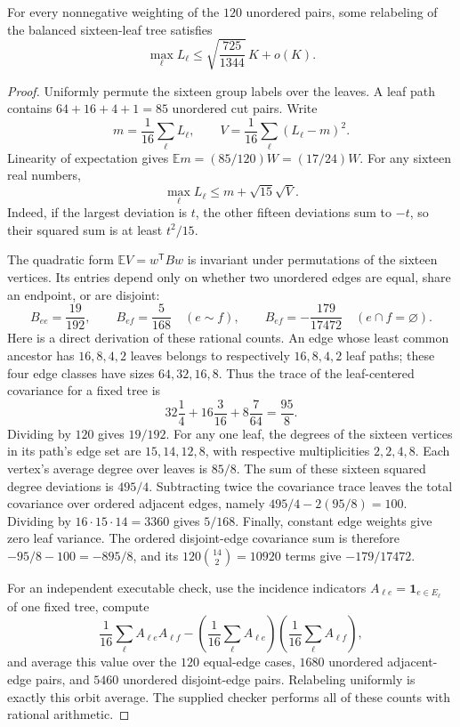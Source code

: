 \begin{lemma}
\label{lem:adaptive-tree-moment-new}
For every nonnegative weighting of the $120$ unordered pairs, some
relabeling of the balanced sixteen-leaf tree satisfies
\[
 \max_\ell L_\ell
 \le \sqrt{\frac{725}{1344}}\,K+o(K).
\]
\end{lemma}

\begin{proof}
Uniformly permute the sixteen group labels over the leaves. A leaf path
contains $64+16+4+1=85$ unordered cut pairs. Write
\[
 m=\frac1{16}\sum_\ell L_\ell,\qquad
 V=\frac1{16}\sum_\ell(L_\ell-m)^2.
\]
Linearity of expectation gives $\mathbb E m=(85/120)W=(17/24)W$.
For any sixteen real numbers,
\[
 \max_\ell L_\ell\le m+\sqrt{15}\sqrt V.
\]
Indeed, if the largest deviation is $t$, the other fifteen deviations
sum to $-t$, so their squared sum is at least $t^2/15$.

The quadratic form $\mathbb E V=w^{\mathsf T}Bw$ is invariant under
permutations of the sixteen vertices. Its entries depend only on whether
two unordered edges are equal, share an endpoint, or are disjoint:
\[
 B_{ee}=\frac{19}{192},\qquad
 B_{ef}=\frac5{168}\quad(e\sim f),\qquad
 B_{ef}=-\frac{179}{17472}\quad(e\cap f=\varnothing).
\]
Here is a direct derivation of these rational counts. An edge whose least
common ancestor has $16,8,4,2$ leaves belongs to respectively
$16,8,4,2$ leaf paths; these four edge classes have sizes $64,32,16,8$.
Thus the trace of the leaf-centered covariance for a fixed tree is
\[
 32\frac14+16\frac3{16}+8\frac7{64}=\frac{95}{8}.
\]
Dividing by $120$ gives $19/192$. For any one leaf, the degrees of the
sixteen vertices in its path's edge set are $15,14,12,8$, with respective
multiplicities $2,2,4,8$. Each vertex's average degree over leaves is
$85/8$. The sum of these sixteen squared degree deviations is $495/4$.
Subtracting twice the covariance trace leaves the total covariance over
ordered adjacent edges, namely $495/4-2(95/8)=100$. Dividing by
$16\cdot15\cdot14=3360$ gives $5/168$. Finally, constant edge weights give
zero leaf variance. The ordered disjoint-edge covariance sum is therefore
$-95/8-100=-895/8$, and its $120\binom{14}{2}=10920$ terms give
$-179/17472$.

For an independent executable check, use the incidence indicators
$A_{\ell e}=\mathbf1_{e\in E_\ell}$ of one fixed tree, compute
\[
 \frac1{16}\sum_\ell A_{\ell e}A_{\ell f}
 -\left(\frac1{16}\sum_\ell A_{\ell e}\right)
  \left(\frac1{16}\sum_\ell A_{\ell f}\right),
\]
and average this value over the $120$ equal-edge cases, $1680$ unordered
adjacent-edge pairs, and $5460$ unordered disjoint-edge pairs. Relabeling
uniformly is exactly this orbit average. The supplied checker performs
all of these counts with rational arithmetic.


\end{proof}

